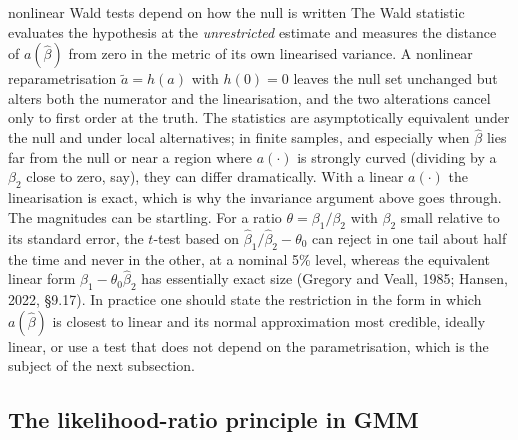 \documentclass[11pt,a4paper]{article}
\newcommand{\bh}{\hat\beta}
\begin{document}
\begin{whybox}{nonlinear Wald tests depend on how the null is written}
The Wald statistic evaluates the hypothesis at the \emph{unrestricted} estimate and measures the distance of $a(\bh)$ from zero in the metric of its own linearised variance. A nonlinear reparametrisation $\tilde a=h(a)$ with $h(0)=0$ leaves the null set unchanged but alters both the numerator and the linearisation, and the two alterations cancel only to first order at the truth. The statistics are asymptotically equivalent under the null and under local alternatives; in finite samples, and especially when $\bh$ lies far from the null or near a region where $a(\cdot)$ is strongly curved (dividing by a $\beta_2$ close to zero, say), they can differ dramatically. With a linear $a(\cdot)$ the linearisation is exact, which is why the invariance argument above goes through. The magnitudes can be startling. For a ratio $\theta=\beta_1/\beta_2$ with $\beta_2$ small relative to its standard error, the $t$-test based on $\hat\beta_1/\hat\beta_2-\theta_0$ can reject in one tail about half the time and never in the other, at a nominal 5\% level, whereas the equivalent linear form $\hat\beta_1-\theta_0\hat\beta_2$ has essentially exact size (Gregory and Veall, 1985; Hansen, 2022, \S9.17). In practice one should state the restriction in the form in which $a(\bh)$ is closest to linear and its normal approximation most credible, ideally linear, or use a test that does not depend on the parametrisation, which is the subject of the next subsection.
\end{whybox}

\subsection{The likelihood-ratio principle in GMM}\label{sec:gmmlr}
\end{document}
